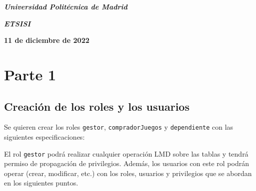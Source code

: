 \documentclass[a4paper, 11pt, oneside]{article} %
\newcommand{\plogo}{\fbox{$\mathcal{LCDPM}$}} %
\begin{document}
\begin{titlepage}
	\vspace{1.0\baselineskip} %
	
	\textit{\textbf{Universidad Politécnica de Madrid \\}} %

	\vspace{0.25\baselineskip} %

	\textit{\textbf{ETSISI}} %
	
	\vfill %
	
	
	\textbf{11 de diciembre de 2022} %
	
	\vspace{0.5\baselineskip} %

	\plogo %

\end{titlepage}


\renewcommand*\contentsname{Índice} %

\setcounter{tocdepth}{3} %

\tableofcontents %

\newpage

	
\section{Parte 1}




\subsection{Creación de los roles y los usuarios}

Se quieren crear los roles \texttt{gestor}, \texttt{compradorJuegos} y \texttt{dependiente} con las siguientes especificaciones:

El rol \texttt{gestor} podrá realizar cualquier operación LMD sobre las tablas y tendrá permiso de propagación de privilegios. Además, los usuarios con este rol podrán operar (crear, modificar, etc.) con los roles, usuarios y privilegios que se abordan en los siguientes puntos.
\end{document}
